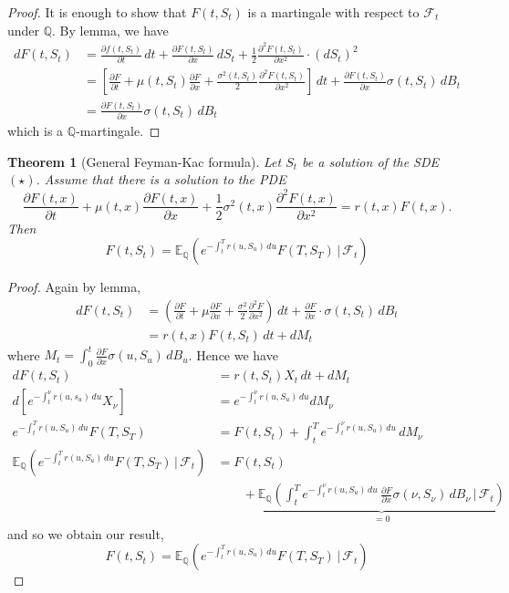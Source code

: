 \documentclass[10pt, oneside, reqno]{amsart}
\theoremstyle{plain}%
\newtheorem{thm}{Theorem}[section]
\theoremstyle{definition}
\theoremstyle{remark}
\newcommand{\given}{ \, | \,}
\newcommand{\Q}{\mathbb{Q}}
\newcommand{\E}{\mathbb{E}}
\newcommand{\sigf}{\mathcal{F}}
\begin{document}
\begin{proof}
    It is enough to show that $F(t, S_t)$ is a martingale with respect to $\sigf_t$ under $\Q$.  By \itos lemma, we have \begin{align*}
        dF(t, S_t) &= \frac{\partial f(t, S_t)}{\partial t} \, dt + \frac{\partial F(t, S_t)}{\partial x} \, dS_t + \frac{1}{2} \frac{\partial^2 F(t, S_t)}{\partial x^2} \cdot (dS_t)^2 \\
        &= \left[ \frac{\partial F}{\partial t} + \mu(t, S_t) \frac{\partial F}{\partial x} + \frac{\sigma^2(t, S_t)}{2} \frac{\partial^2 F(t, S_t)}{\partial x^2} \right] \, dt + \frac{\partial F(t, S_t)}{\partial x} \sigma(t, S_t) \, dB_t \\
        &= \frac{\partial F(t, S_t)}{\partial x} \sigma(t, S_t) \, dB_t
    \end{align*} which is a $\Q$-martingale.
\end{proof}

\begin{thm}[General Feyman-Kac formula]
    Let $S_t$ be a solution of the SDE $(\star)$.  Assume that there is a solution to the PDE \[
        \frac{\partial F(t, x)}{\partial t} + \mu(t, x) \frac{\partial F(t, x)}{\partial x} + \frac{1}{2} \sigma^2(t, x) \frac{\partial^2 F(t, x)}{\partial x^2} = r(t, x) F(t, x).
    \]  Then \[
        F(t, S_t) = \E_\Q\left( e^{-\int_t^T r(u, S_u) \, du} F(T, S_T) \given \sigf_t \right)
    \]
\end{thm}

\begin{proof}
    Again by \itos lemma, \begin{align*}
        dF(t, S_t) &= \left( \frac{\partial F}{\partial t} + \mu \frac{\partial F}{\partial x} + \frac{\sigma^2}{2} \frac{\partial^2 F}{\partial x^2} \right) \, dt + \frac{\partial F}{\partial x} \cdot \sigma(t, S_t) \, dB_t \\
        &= r(t, x) F(t, S_t)\, dt + dM_t
    \end{align*}  
    where $M_t = \int_0^t \frac{\partial F}{\partial x} \sigma(u, S_u) \, dB_u$.  Hence we have \begin{align*}
        dF(t, S_t)  &= r(t, S_t) X_t \, dt + dM_t \\
\tag{$\Rightarrow$}     d\left[ e^{-\int_t^\nu r(u, s_u)\, du} X_\nu \right] &= e^{-\int_t^\nu r(u, S_u) \, du} dM_\nu \\
\tag{$\Rightarrow$}     e^{-\int_t^T r(u, S_u) \, du} F(T, S_T) &= F(t, S_t) + \int_t^T e^{-\int_t^\nu r(u, S_u)\, du} \, dM_\nu  \\
\tag{$\Rightarrow$}     \E_\Q \left(    e^{-\int_t^T r(u, S_u) \, du} F(T, S_T) \given \sigf_t \right) &= F(t, S_t) \\
            &\qquad +  \underbrace{\E_\Q \left( \int_t^T e^{-\int_t^\nu r(u, S_u)\, du} \, \frac{\partial F}{\partial x} \sigma(\nu, S_\nu) \, dB_\nu \given \sigf_t \right)}_{= 0} 
    \end{align*} and so we obtain our result, \[
        F(t, S_t) = \E_\Q\left( e^{-\int_t^T r(u, S_u) \, du} F(T, S_T) \given \sigf_t \right)
    \]
\end{proof}
\end{document}
